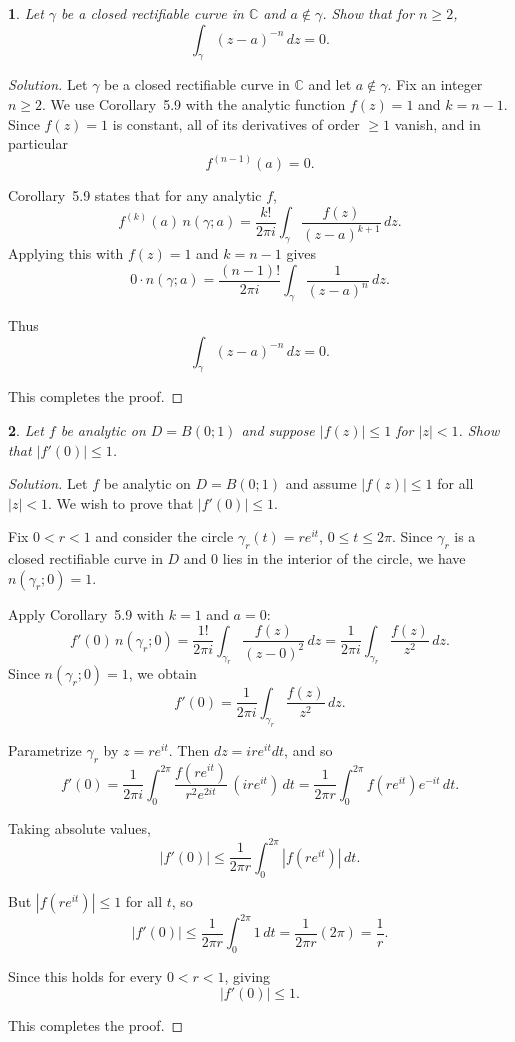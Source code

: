 \documentclass[12pt, a4paper]{report}
\theoremstyle{spaced}
\newtheorem{exercise}{}
\newcommand{\setexercise}[1]{\setcounter{exercise}{#1-1}}
\begin{document}
\setexercise{5}
\begin{exercise}
	Let $\gamma$ be a closed rectifiable curve in $\mathbb{C}$ and $a \notin \gamma$.
	Show that for $n \ge 2$,
	\[
		\int_{\gamma} (z-a)^{-n}\, dz = 0.
	\]
\end{exercise}

\begin{proof}[Solution]
	Let $\gamma$ be a closed rectifiable curve in $\mathbb{C}$ and let $a\notin\gamma$.
	Fix an integer $n\ge 2$.
	We use Corollary~5.9 with the analytic function $f(z)=1$ and $k=n-1$.
	Since $f(z)=1$ is constant, all of its derivatives of order $\ge 1$ vanish, and in
	particular
	\[
		f^{(n-1)}(a)=0.
	\]

	Corollary~5.9 states that for any analytic $f$,
	\[
		f^{(k)}(a)\, n(\gamma;a)
		= \frac{k!}{2\pi i} \int_\gamma \frac{f(z)}{(z-a)^{k+1}}\, dz.
	\]
	Applying this with $f(z)=1$ and $k=n-1$ gives
	\[
		0 \cdot n(\gamma;a)
		= \frac{(n-1)!}{2\pi i} \int_\gamma \frac{1}{(z-a)^n}\, dz.
	\]

	Thus
	\[
		\int_\gamma (z-a)^{-n}\, dz = 0.
	\]

	This completes the proof.
\end{proof}

\setexercise{6}
\begin{exercise}
	Let $f$ be analytic on $D = B(0;1)$ and suppose $|f(z)| \le 1$ for $|z| < 1$.
	Show that $|f'(0)| \le 1$.
\end{exercise}

\begin{proof}[Solution]
	Let $f$ be analytic on $D=B(0;1)$ and assume $|f(z)|\le 1$ for all $|z|<1$.
	We wish to prove that $|f'(0)|\le 1$.

	Fix $0<r<1$ and consider the circle $\gamma_r(t)=re^{it}$, $0\le t\le 2\pi$.
	Since $\gamma_r$ is a closed rectifiable curve in $D$ and $0$ lies in the interior of
	the circle, we have $n(\gamma_r;0)=1$.

	Apply Corollary~5.9 with $k=1$ and $a=0$:
	\[
		f'(0)\, n(\gamma_r;0)
		=
		\frac{1!}{2\pi i}
		\int_{\gamma_r} \frac{f(z)}{(z-0)^{2}}\,dz
		=
		\frac{1}{2\pi i}
		\int_{\gamma_r} \frac{f(z)}{z^{2}}\,dz.
	\]
	Since $n(\gamma_r;0)=1$, we obtain
	\[
		f'(0)
		= \frac{1}{2\pi i} \int_{\gamma_r} \frac{f(z)}{z^{2}}\,dz.
	\]

	Parametrize $\gamma_r$ by $z=re^{it}$.
	Then $dz = i r e^{it}dt$, and so
	\[
		f'(0)
		= \frac{1}{2\pi i}
		\int_{0}^{2\pi}
		\frac{f(re^{it})}{r^{2} e^{2it}}\, (i r e^{it})\, dt
		=
		\frac{1}{2\pi r}
		\int_{0}^{2\pi} f(re^{it}) e^{-it}\, dt.
	\]

	Taking absolute values,
	\[
		|f'(0)|
		\le \frac{1}{2\pi r}
		\int_{0}^{2\pi} |f(re^{it})|\, dt.
	\]

	But $|f(re^{it})|\le 1$ for all $t$, so
	\[
		|f'(0)|
		\le \frac{1}{2\pi r} \int_{0}^{2\pi} 1\, dt
		= \frac{1}{2\pi r} (2\pi)
		= \frac{1}{r}.
	\]

	Since this holds for every $0<r<1$, giving
	\[
		|f'(0)| \le 1.
	\]

	This completes the proof.
\end{proof}
\end{document}
